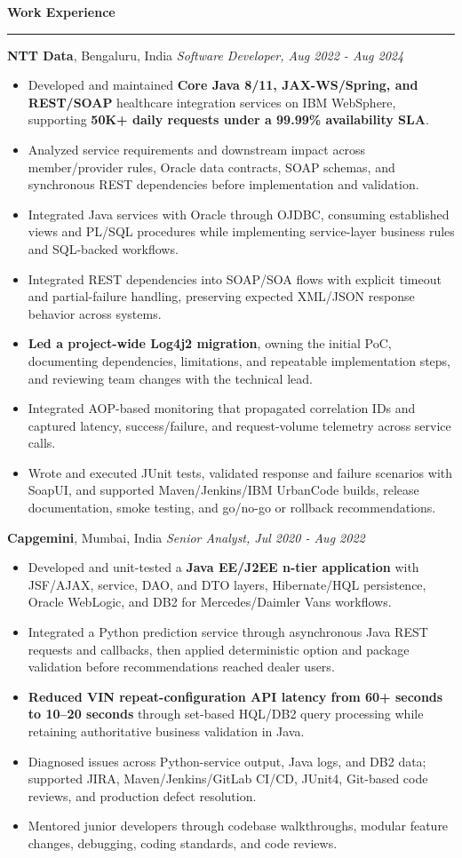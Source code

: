 \documentclass[11pt,letterpaper]{article}
\newcommand{\ressection}[1]{\Needspace{6\baselineskip}\vspace{8pt}\par\textbf{#1}\par\vspace{2pt}\hrule\vspace{5pt}}
\begin{document}
\ressection{Work Experience}
\textbf{NTT Data}, Bengaluru, India \hfill \textit{Software Developer, Aug 2022 - Aug 2024}
\begin{itemize}
  \item Developed and maintained \textbf{Core Java 8/11, JAX-WS/Spring, and REST/SOAP} healthcare integration services on IBM WebSphere, supporting \textbf{50K+ daily requests under a 99.99\% availability SLA}.
  \item Analyzed service requirements and downstream impact across member/provider rules, Oracle data contracts, SOAP schemas, and synchronous REST dependencies before implementation and validation.
  \item Integrated Java services with Oracle through OJDBC, consuming established views and PL/SQL procedures while implementing service-layer business rules and SQL-backed workflows.
  \item Integrated REST dependencies into SOAP/SOA flows with explicit timeout and partial-failure handling, preserving expected XML/JSON response behavior across systems.
  \item \textbf{Led a project-wide Log4j2 migration}, owning the initial PoC, documenting dependencies, limitations, and repeatable implementation steps, and reviewing team changes with the technical lead.
  \item Integrated AOP-based monitoring that propagated correlation IDs and captured latency, success/failure, and request-volume telemetry across service calls.
  \item Wrote and executed JUnit tests, validated response and failure scenarios with SoapUI, and supported Maven/Jenkins/IBM UrbanCode builds, release documentation, smoke testing, and go/no-go or rollback recommendations.
\end{itemize}
\textbf{Capgemini}, Mumbai, India \hfill \textit{Senior Analyst, Jul 2020 - Aug 2022}
\begin{itemize}
  \item Developed and unit-tested a \textbf{Java EE/J2EE n-tier application} with JSF/AJAX, service, DAO, and DTO layers, Hibernate/HQL persistence, Oracle WebLogic, and DB2 for Mercedes/Daimler Vans workflows.
  \item Integrated a Python prediction service through asynchronous Java REST requests and callbacks, then applied deterministic option and package validation before recommendations reached dealer users.
  \item \textbf{Reduced VIN repeat-configuration API latency from 60+ seconds to 10--20 seconds} through set-based HQL/DB2 query processing while retaining authoritative business validation in Java.
  \item Diagnosed issues across Python-service output, Java logs, and DB2 data; supported JIRA, Maven/Jenkins/GitLab CI/CD, JUnit4, Git-based code reviews, and production defect resolution.
  \item Mentored junior developers through codebase walkthroughs, modular feature changes, debugging, coding standards, and code reviews.
\end{itemize}
\end{document}
